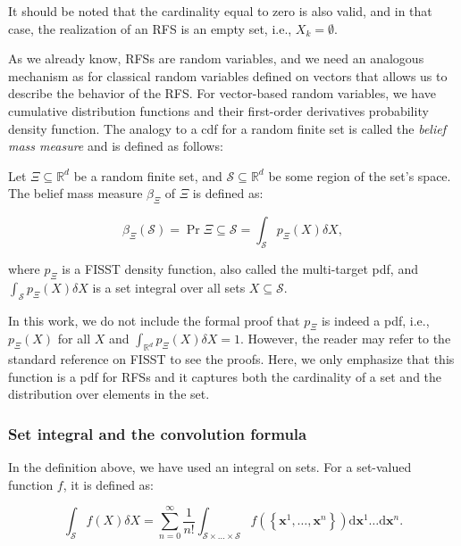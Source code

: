 It should be noted that the cardinality equal to zero is also valid, and in that case, the realization of an RFS is an empty set, i.e., $X_k = \emptyset$.

As we already know, RFSs are random variables, and we need an analogous mechanism as for classical random variables defined on vectors that allows us to describe the behavior of the RFS. For vector-based random variables, we have cumulative distribution functions and their first-order derivatives probability density function. The analogy to a cdf for a random finite set is called the \textit{belief mass measure} and is defined as follows:

\begin{definition}
    Let $\Xi \subseteq \mathbb{R}^d$ be a random finite set, and $\mathcal{S} \subseteq \mathbb{R}^d$ be some region of the set's space. The belief mass measure $\beta_\Xi$ of $\Xi$ is defined as:

    \begin{equation}
        \beta_\Xi(\mathcal{S})
        = \Pr{\Xi \subseteq \mathcal{S}}
        = \int_\mathcal{S} p_\Xi(X)\delta X,
    \end{equation}

    where $p_\Xi$ is a FISST density function, also called the multi-target pdf, and $\int_\mathcal{S} p_\Xi(X)\delta X$ is a set integral over all sets $X \subseteq \mathcal{S}$.
\end{definition}

In this work, we do not include the formal proof that $p_\Xi$ is indeed a pdf, i.e., $p_\Xi(X)$ for all $X$ and $\int_{\mathbb{R}^d} p_\Xi(X)\delta X = 1$. However, the reader may refer to the standard reference on FISST \cite{mahlerStatisticalMultisourcemultitargetInformation2007} to see the proofs. Here, we only emphasize that this function is a pdf for RFSs and it captures both the cardinality of a set and the distribution over elements in the set.

\subsubsection{Set integral and the convolution formula}

In the definition above, we have used an integral on sets. For a set-valued function $f$, it is defined as:

\begin{equation}\label{eq:set-integral}
    \int_\mathcal{S} f(X) \delta X =
        \sum_{n=0}^{\infty} \frac{1}{n !}
        \int_{\mathcal{S} \times \ldots \times \mathcal{S}}
            f\left(\left\{\mathbf{x}^1, \ldots, \mathbf{x}^n\right\}\right) \mathrm{d} \mathbf{x}^1 \ldots \mathrm{d} \mathbf{x}^n.
\end{equation}


